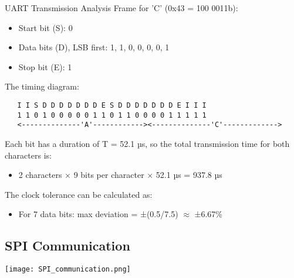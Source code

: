 \begin{example2}{UART Transmission Analysis}
Frame for 'C' (0x43 = 100 0011b):
\begin{itemize}
    \item Start bit (S): 0
    \item Data bits (D), LSB first: 1, 1, 0, 0, 0, 0, 1
    \item Stop bit (E): 1
\end{itemize}

The timing diagram:
\begin{verbatim}
   I I S D D D D D D D E S D D D D D D D E I I I
   1 1 0 1 0 0 0 0 0 1 1 0 1 1 0 0 0 0 1 1 1 1 1
   <--------------'A'------------><--------------'C'------------->
\end{verbatim}

Each bit has a duration of T = 52.1 µs, so the total transmission time for both characters is:
\begin{itemize}
    \item 2 characters × 9 bits per character × 52.1 µs = 937.8 µs
\end{itemize}

The clock tolerance can be calculated as:
\begin{itemize}
    \item For 7 data bits: max deviation = ±(0.5/7.5) $\approx$ ±6.67\%
\end{itemize}
\end{example2}

\subsection{SPI Communication}

\texttt{[image: SPI\_communication.png]}

